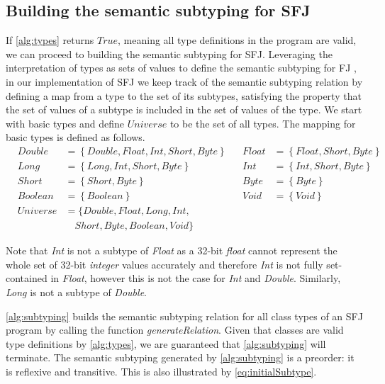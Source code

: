 \documentclass[runningheads]{llncs}
\begin{document}
\subsection{Building the semantic subtyping for SFJ}
If \autoref{alg:types} returns $True$, meaning all type definitions in the program are valid, we can proceed to building the semantic subtyping for SFJ.
Leveraging the interpretation of types as sets of values to define the semantic subtyping for FJ \cite{Dardha2013,Dardha2017}, in our implementation of SFJ we keep track of the semantic subtyping relation by defining a map from a type to the set of its subtypes, satisfying the property that the set of values of a subtype is included in the set of values of the type.
We start with basic types and define $Universe$ to be the set of all types.
The mapping for basic types is defined as follows.
\begin{equation}
    \label{eq:initialSubtype}
    \begin{array}{llllll}
        & Double   & = \left\{Double, Float, Int, Short, Byte\right\} &  & Float & = \left\{Float, Short, Byte\right\} \\
        & Long     & =    \left\{Long, Int, Short, Byte\right\}       &  & Int   & = \left\{Int, Short, Byte\right\}   \\
        & Short    & =    \left\{Short, Byte\right\}                  &  & Byte  & = \left\{Byte\right\}               \\
        & Boolean  & =    \left\{Boolean\right\}                      &  & Void  & = \left\{Void\right\}               \\
        & Universe & = \{Double, Float, Long, Int,                                                                     \\
        &          & \quad Short, Byte, Boolean, Void\}
   \end{array}
\end{equation}


Note that \emph{Int} is not a subtype of \emph{Float} as a 32-bit \emph{float} cannot represent the whole set of 32-bit \emph{integer} values accurately and therefore \emph{Int} is not fully set-contained in \emph{Float}, however this is not the case for \emph{Int} and \emph{Double}.
Similarly, \emph{Long} is not a subtype of \emph{Double}.

\autoref{alg:subtyping} builds the semantic subtyping relation for all class types of an SFJ program by calling the function \textit{generateRelation}. Given that classes are valid type definitions by \autoref{alg:types}, we are guaranteed that \autoref{alg:subtyping} will terminate.
The semantic subtyping generated by \autoref{alg:subtyping} is a preorder: it is reflexive and transitive. This is also illustrated by \autoref{eq:initialSubtype}.
\end{document}
